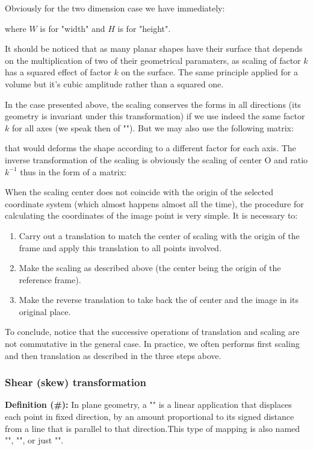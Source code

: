 	Obviously for the two dimension case we have immediately:
	
	where $W$ is for "width" and $H$ is for "height".
		
	\begin{tcolorbox}[title=Remark,colframe=black,arc=10pt]
	It  should be noticed that as many planar shapes have their surface that depends on the multiplication of two of their geometrical paramaters, as scaling of factor $k$ has a squared effect of factor $k$ on the surface. The same principle applied for a volume but it's cubic amplitude rather than a squared one.
	\end{tcolorbox}
	In the case presented above, the scaling conserves the forms in all directions (its geometry is invariant under this transformation) if we use indeed the same factor $k$ for all axes (we speak then of ""). But we may also use the following matrix:
	
	that would deforms the shape according to a different factor for each axis.
	The inverse transformation of the scaling is obviously the scaling of center O and ratio $k^{-1}$ thus in the form of a matrix:
	
	When the scaling center does not coincide with the origin of the selected coordinate system (which almost happens almost all the time), the procedure for calculating the coordinates of the image point is very simple. It is necessary to:
	\begin{enumerate}
		\item Carry out a translation to match the center of scaling with the origin of the frame and apply this translation to all points involved.

		\item Make the scaling as described above (the center being the origin of the reference frame).

		\item Make the reverse translation to take back the of center and the image in its original place.
	\end{enumerate}
	To conclude, notice that the successive operations of translation and scaling are not commutative in the general case. In practice, we often performs first scaling and then translation as described in the three steps above.
	
	\subsubsection{Shear (skew) transformation}
	\textbf{Definition (\#\mydef):} In plane geometry, a "" is a linear application that displaces each point in fixed direction, by an amount proportional to its signed distance from a line that is parallel to that direction.This type of mapping is also named "", "", or just "".
	
